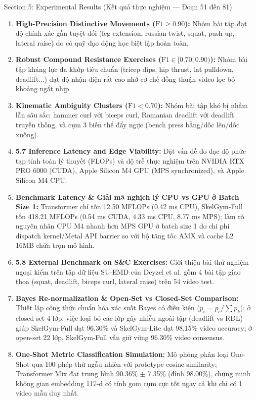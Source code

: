 \documentclass[10pt,a4paper]{article}
\begin{document}
\begin{secbox}{Section 5: Experimental Results (Kết quả thực nghiệm — Đoạn 51 đến 81)}
\begin{enumerate}[leftmargin=*, itemsep=2pt, topsep=1pt, start=51]
    \item \textbf{High-Precision Distinctive Movements ($\text{F1} \ge 0.90$):} Nhóm bài tập đạt độ chính xác gần tuyệt đối (leg extension, russian twist, squat, push-up, lateral raise) do có quỹ đạo động học biệt lập hoàn toàn.
    \item \textbf{Robust Compound Resistance Exercises ($\text{F1} \in [0.70, 0.90)$):} Nhóm bài tập kháng lực đa khớp tiêu chuẩn (tricep dips, hip thrust, lat pulldown, deadlift...) đạt độ nhận diện rất cao nhờ cơ chế đồng thuận video lọc bỏ khoảng ngắt nhịp.
    \item \textbf{Kinematic Ambiguity Clusters ($\text{F1} < 0.70$):} Nhóm bài tập khó bị nhầm lẫn sâu sắc: hammer curl với biceps curl, Romanian deadlift với deadlift truyền thống, và cụm 3 biến thể đẩy ngực (bench press bằng/dốc lên/dốc xuống).
    \item \textbf{5.7 Inference Latency and Edge Viability:} Đặt vấn đề đo đạc độ phức tạp tính toán lý thuyết (FLOPs) và độ trễ thực nghiệm trên NVIDIA RTX PRO 6000 (CUDA), Apple Silicon M4 GPU (MPS synchronized), và Apple Silicon M4 CPU.
    \item \textbf{Benchmark Latency \& Giải mã nghịch lý CPU vs GPU ở Batch Size 1:} Transformer chỉ tốn 12.50 MFLOPs (0.42 ms CPU), SkelGym-Full tốn 418.21 MFLOPs (0.54 ms CUDA, 4.33 ms CPU, 8.77 ms MPS); làm rõ nguyên nhân CPU M4 nhanh hơn MPS GPU ở batch size 1 do chi phí dispatch kernel/Metal API barrier so với bộ tăng tốc AMX và cache L2 16MB chứa trọn mô hình.
    \item \textbf{5.8 External Benchmark on S\&C Exercises:} Giới thiệu bài thử nghiệm ngoại kiểm trên tập dữ liệu SU-EMD của Deyzel et al. gồm 4 bài tập giao thoa (squat, deadlift, biceps curl, lateral raise) trên 54 video test.
    \item \textbf{Bayes Re-normalization \& Open-Set vs Closed-Set Comparison:} Thiết lập công thức chuẩn hóa xác suất Bayes có điều kiện ($\tilde{p}_c = p_c / \sum p_k$); ở closed-set 4 lớp, việc loại bỏ các lớp gây nhiễu ngoài tập (deadlift vs RDL) giúp SkelGym-Full đạt 96.30\% và SkelGym-Lite đạt 98.15\% video accuracy; ở open-set 22 lớp, SkelGym-Full vẫn giữ vững 96.30\% video consensus.
    \item \textbf{One-Shot Metric Classification Simulation:} Mô phỏng phân loại One-Shot qua 100 phép thử ngẫu nhiên với prototype cosine similarity; Transformer Mix đạt trung bình 90.36\% $\pm$ 7.35\% (đỉnh 98.00\%), chứng minh không gian embedding 117-d có tính gom cụm cực tốt ngay cả khi chỉ có 1 video mẫu duy nhất.
\end{enumerate}
\end{secbox}
\end{document}
